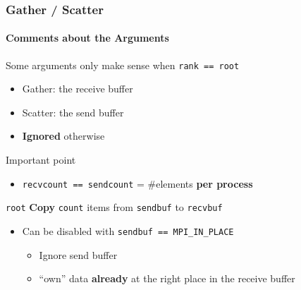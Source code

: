 \documentclass[xcolor={x11names,svgnames,psnames}]{beamer}
\begin{document}

\begin{frame}[fragile=singleslide]
  \frametitle{Gather / Scatter}
  \framesubtitle{Comments about the Arguments}
  
  \begin{exampleblock}{Some arguments only make sense when \texttt{rank == root}}
    \begin{itemize}
    \item Gather: the receive buffer
    \item Scatter: the send buffer
    \item \textbf{Ignored} otherwise
    \end{itemize}
  \end{exampleblock}

  \begin{block}{Important point}
    \begin{itemize}
    \item \texttt{recvcount == sendcount} = \#elements \textbf{per process}
    \end{itemize}
  \end{block}
  
  \begin{alertblock}{\texttt{root} \textbf{Copy} \texttt{count}
      items from \texttt{sendbuf} to \texttt{recvbuf}}
    \begin{itemize}
    \item Can be disabled with \texttt{sendbuf == MPI_IN_PLACE}
      \begin{itemize}
      \item Ignore send buffer
      \item ``own'' data \textbf{already} at the right place in the receive buffer
      \end{itemize}
    \end{itemize}
  \end{alertblock}
\end{frame}

\end{document}
